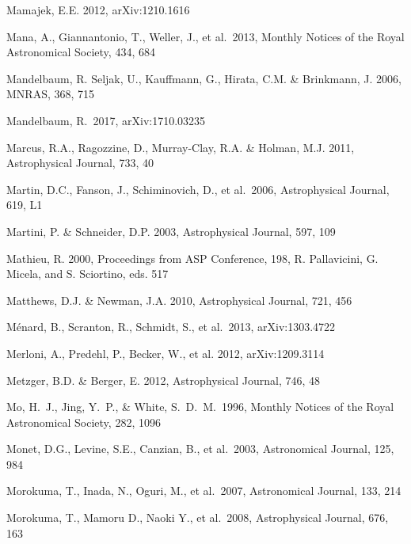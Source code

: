 \documentclass[twocolumn]{aastex61}
\begin{document}
\begin{thebibliography}{}
 Mamajek, E.E. 2012, arXiv:1210.1616

 Mana, A., Giannantonio, T., Weller, J., et al.~2013, Monthly Notices of the Royal Astronomical Society, 434, 684

 Mandelbaum, R. Seljak, U., Kauffmann, G., Hirata, C.M. \& Brinkmann, J. 2006, MNRAS, 368, 715

 Mandelbaum, R.~2017, arXiv:1710.03235

 Marcus, R.A., Ragozzine, D., Murray-Clay, R.A. \& Holman, M.J. 2011, Astrophysical Journal, 733, 40

 Martin, D.C., Fanson, J., Schiminovich, D., et al.~2006, Astrophysical Journal, 619, L1

 Martini, P. \& Schneider, D.P. 2003, Astrophysical Journal, 597, 109

 Mathieu, R. 2000, Proceedings from ASP Conference, 198, R. Pallavicini, G. Micela, and S. Sciortino, eds. 517

 Matthews, D.J. \& Newman, J.A. 2010, Astrophysical Journal, 721, 456

 M\'{e}nard, B., Scranton, R., Schmidt, S., et al.~2013, arXiv:1303.4722

 Merloni, A., Predehl, P., Becker, W., et al. 2012, arXiv:1209.3114

 Metzger, B.D. \& Berger, E. 2012, Astrophysical Journal, 746, 48

 Mo, H.~J., Jing, Y.~P., \& White, S.~D.~M.\ 1996, Monthly Notices of the Royal Astronomical Society, 282, 1096

 Monet, D.G., Levine, S.E., Canzian, B., et al.~2003, Astronomical Journal, 125, 984

 Morokuma, T., Inada, N., Oguri, M., et al.~2007, Astronomical Journal, 133, 214

 Morokuma, T., Mamoru D., Naoki Y., et al.~2008, Astrophysical Journal, 676, 163


\end{thebibliography}
\end{document}
